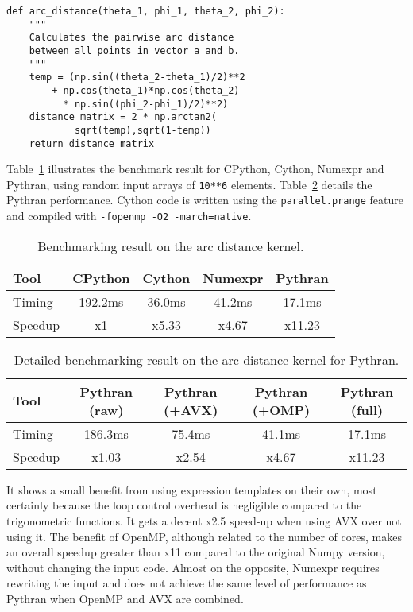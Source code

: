 \documentclass[10pt, onecolumn, preprint]{sigplanconf}
\begin{document}
\begin{lstlisting}
def arc_distance(theta_1, phi_1, theta_2, phi_2):
    """
    Calculates the pairwise arc distance
    between all points in vector a and b.
    """
    temp = (np.sin((theta_2-theta_1)/2)**2
        + np.cos(theta_1)*np.cos(theta_2)
          * np.sin((phi_2-phi_1)/2)**2)
    distance_matrix = 2 * np.arctan2(
            sqrt(temp),sqrt(1-temp))
    return distance_matrix
\end{lstlisting}


Table~\ref{tbl:arc-distance} illustrates the benchmark result for CPython,
Cython, Numexpr and Pythran, using random input arrays of \texttt{10**6} elements.
Table~\ref{tbl:arc-distance-2} details the Pythran performance. Cython code
is written using the \texttt{parallel.prange} feature and compiled with
\texttt{-fopenmp -O2 -march=native}.


\begin{table}
    \centering
    \begin{tabular}{|l|c|c|c|c|}
    \hline
     Tool    &  CPython    &  Cython  &  Numexpr    & Pythran   \\
    \hline
     Timing  &  192.2ms    &  36.0ms  &    41.2ms   &  17.1ms   \\
    \hline
     Speedup &  x1         &  x5.33   &  x4.67      &  x11.23   \\
    \hline
\end{tabular}
\caption{Benchmarking result on the arc distance kernel.}
\label{tbl:arc-distance}
\end{table}

\begin{table}
    \centering
    \begin{tabular}{|l|c|c|c|c|}
    \hline
    Tool & Pythran (raw) & Pythran (+AVX) & Pythran (+OMP) & Pythran (full)  \\
    \hline
    Timing & 186.3ms     &    75.4ms      &    41.1ms      &  17.1ms         \\
    \hline
    Speedup&    x1.03      &    x2.54       &    x4.67       &  x11.23         \\
    \hline
\end{tabular}
\caption{Detailed benchmarking result on the arc distance kernel for Pythran.}
\label{tbl:arc-distance-2}
\end{table}

It shows a small benefit from using expression templates on their own, most
certainly because the loop control overhead is negligible compared to the
trigonometric functions. It gets a decent x2.5 speed-up when using AVX over not
using it. The benefit of OpenMP, although related to the number of cores, makes
an overall speedup greater than x11 compared to the original Numpy version, 
without
changing the input code. Almost on the opposite, Numexpr requires rewriting the 
input and does not achieve the same level of performance as Pythran when OpenMP
and AVX are combined.
\end{document}
